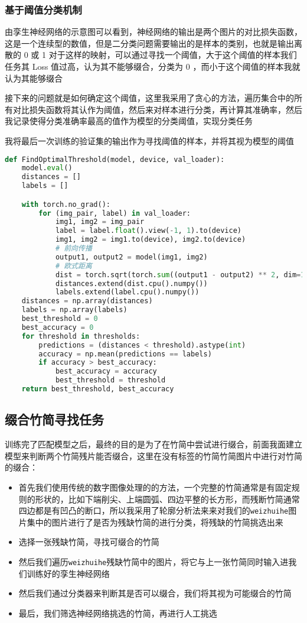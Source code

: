 \documentclass{article}
\begin{document}
\subsubsection{基于阈值分类机制}

由孪生神经网络的示意图可以看到，神经网络的输出是两个图片的对比损失函数，这是一个连续型的数值，但是二分类问题需要输出的是样本的类别，也就是输出离散的 0 或 1 对于这样的映射，可以通过寻找一个阈值，大于这个阈值的样本我们任务其 Loss 值过高，认为其不能够缀合，分类为 0 ，而小于这个阈值的样本我就认为其能够缀合

接下来的问题就是如何确定这个阈值，这里我采用了贪心的方法，遍历集合中的所有对比损失函数将其认作为阈值，然后来对样本进行分类，再计算其准确率，然后我记录使得分类准确率最高的值作为模型的分类阈值，实现分类任务

我将最后一次训练的验证集的输出作为寻找阈值的样本，并将其视为模型的阈值
\begin{lstlisting}[language=Python]
def FindOptimalThreshold(model, device, val_loader):
    model.eval()
    distances = []
    labels = []

    with torch.no_grad():
        for (img_pair, label) in val_loader:
            img1, img2 = img_pair
            label = label.float().view(-1, 1).to(device)
            img1, img2 = img1.to(device), img2.to(device)
            # 前向传播
            output1, output2 = model(img1, img2)
            # 欧式距离
            dist = torch.sqrt(torch.sum((output1 - output2) ** 2, dim=1))
            distances.extend(dist.cpu().numpy())
            labels.extend(label.cpu().numpy())
    distances = np.array(distances)
    labels = np.array(labels)
    best_threshold = 0
    best_accuracy = 0
    for threshold in thresholds:
        predictions = (distances < threshold).astype(int)
        accuracy = np.mean(predictions == labels)
        if accuracy > best_accuracy:
            best_accuracy = accuracy
            best_threshold = threshold
    return best_threshold, best_accuracy
\end{lstlisting}

\subsection{缀合竹简寻找任务}

训练完了匹配模型之后，最终的目的是为了在竹简中尝试进行缀合，前面我面建立模型来判断两个竹简残片能否缀合，这里在没有标签的竹简竹简图片中进行对竹简的缀合：
\begin{itemize}
\item 首先我们使用传统的数字图像处理的的方法，一个完整的竹简通常是有固定规则的形状的，比如下端削尖、上端圆弧、四边平整的长方形，而残断竹简通常四边都是有凹凸的断口，所以我采用了轮廓分析法来来对我们的\texttt{weizhuihe}图片集中的图片进行了是否为残缺竹简的进行分类，将残缺的竹简挑选出来
\item 选择一张残缺竹简，寻找可缀合的竹简
\item 然后我们遍历\texttt{weizhuihe}残缺竹简中的图片，将它与上一张竹简同时输入进我们训练好的孪生神经网络
\item 然后我们通过分类器来判断其是否可以缀合，我们将其视为可能缀合的竹简
\item 最后，我们筛选神经网络挑选的竹简，再进行人工挑选
\end{itemize}
\end{document}
